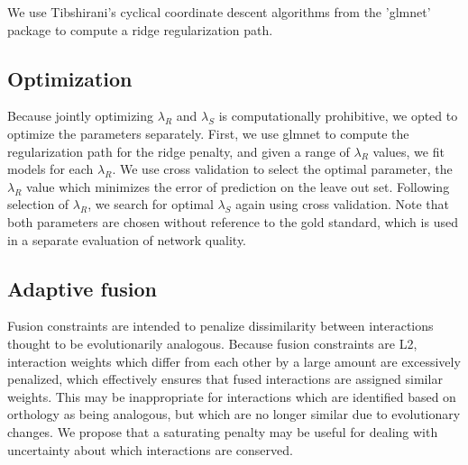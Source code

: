 \documentclass[11pt]{article}
\begin{document}
We use Tibshirani's cyclical coordinate descent algorithms from the 'glmnet' package \cite{friedman_regularization_2010} to compute a ridge regularization path. 


\subsection{Optimization}
Because jointly optimizing $\lambda_R$ and $\lambda_S$ is computationally prohibitive, we opted to optimize the parameters separately. First, we use glmnet to compute the regularization path for the ridge penalty, and given a range of $\lambda_R$ values, we fit models for each $\lambda_R$. We use cross validation to select the optimal parameter, the $\lambda_R$ value which minimizes the error of prediction on the leave out set. Following selection of $\lambda_R$, we search for optimal $\lambda_S$ again using cross validation. Note that both parameters are chosen without reference to the gold standard, which is used in a separate evaluation of network quality. 


\subsection{Adaptive fusion}
Fusion constraints are intended to penalize dissimilarity between interactions thought to be evolutionarily analogous. Because fusion constraints are L2, interaction weights which differ from each other by a large amount are excessively penalized, which effectively ensures that fused interactions are assigned similar weights. This may be inappropriate for interactions which are identified based on orthology as being analogous, but which are no longer similar due to evolutionary changes. We propose that a saturating penalty may be useful for dealing with uncertainty about which interactions are conserved. 
\end{document}
